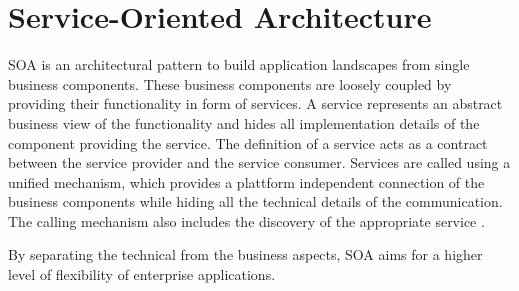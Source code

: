 \section{Service-Oriented Architecture}
\ac{SOA} is an architectural pattern to build application landscapes from single business components. These business components are loosely coupled by providing their functionality in form of services.  A service represents an abstract business view of the functionality and hides all implementation details of the component providing the service. The definition of a service acts as a contract between the service provider and the service consumer. Services are called using a unified mechanism, which provides a plattform independent connection of the business components while hiding all the technical details of the communication. The calling mechanism also includes the discovery of the appropriate service
\citep{Richter:2005ci}.

By separating the technical from the business aspects, SOA aims for a higher level of flexibility of enterprise applications.
